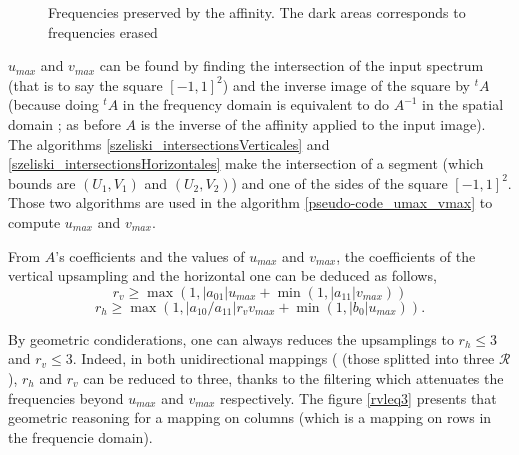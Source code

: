\begin{figure}
		\caption{Frequencies preserved by the affinity. The dark areas corresponds to frequencies erased}
		\label{uMax_vMax}
		\end{figure}
		
 
		 $u_{max}$ and $v_{max}$ can be found by finding the intersection of the input spectrum (that is to say the square $[-1,1]^2$) and the inverse image of the square by $^t\!A$ (because doing  $^t\!A$ in the frequency domain is equivalent to do $A^{-1}$ in the spatial domain ; as before $A$ is the inverse of the affinity applied to the input image). The algorithms \ref{szeliski_intersectionsVerticales} and \ref{szeliski_intersectionsHorizontales} make the intersection of a segment (which bounds are $(U_1,V_1)$ and $(U_2,V_2)$) and one of the sides of the square $[-1,1]^2$. Those two algorithms are used in the algorithm \ref{pseudo-code_umax_vmax} to compute $u_{max}$ and $v_{max}$.


		
		From $A$'s coefficients and the values of $u_{max}$ and $v_{max}$, the coefficients of the vertical upsampling and the horizontal one can be deduced \cite{szeliski2010high} as follows,
		\[r_v \geq \max (1,|a_{01}|u_{max}+\min (1,|a_{11}|v_{max}))\]
		\[r_h \geq \max (1,|a_{10}/a_{11}|r_vv_{max}+\min (1,|b_0|u_{max})).\]


		By geometric condiderations, one can always reduces the upsamplings to $r_h \leq 3$ and $r_v \leq 3$. Indeed, in both unidirectional mappings  ( (those splitted into three $\mathcal R$), $r_h$ and $r_v$ can be reduced to three, thanks to the filtering which attenuates the frequencies beyond $u_{max}$ and $v_{max}$ respectively. The figure \ref{rvleq3} presents that geometric reasoning for a mapping on columns (which is a mapping on rows in the frequencie domain).

